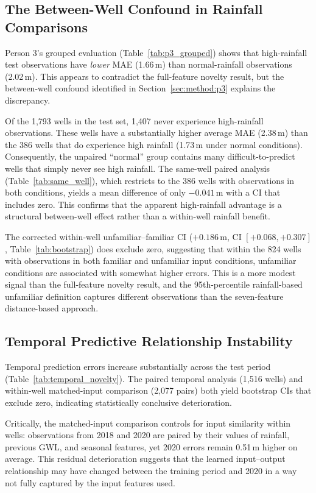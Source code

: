 \documentclass[conference]{IEEEtran}
\begin{document}
\subsection{The Between-Well Confound in Rainfall Comparisons}

Person 3's grouped evaluation (Table~\ref{tab:p3_grouped}) shows that
high-rainfall test observations have \emph{lower} MAE (1.66\,m) than
normal-rainfall observations (2.02\,m).
This appears to contradict the full-feature novelty result, but the
between-well confound identified in Section~\ref{sec:method:p3} explains
the discrepancy.

Of the 1{,}793 wells in the test set, 1{,}407 never experience
high-rainfall observations.
These wells have a substantially higher average MAE (2.38\,m) than the
386 wells that do experience high rainfall (1.73\,m under normal
conditions).
Consequently, the unpaired ``normal'' group contains many
difficult-to-predict wells that simply never see high rainfall.
The same-well paired analysis (Table~\ref{tab:same_well}), which
restricts to the 386 wells with observations in both conditions, yields a
mean difference of only $-0.041$\,m with a CI that includes zero.
This confirms that the apparent high-rainfall advantage is a structural
between-well effect rather than a within-well rainfall benefit.

The corrected within-well unfamiliar--familiar CI
($+0.186$\,m, CI $[+0.068, +0.307]$, Table~\ref{tab:bootstrap}) does
exclude zero, suggesting that within the 824 wells with observations in
both familiar and unfamiliar input conditions, unfamiliar conditions are
associated with somewhat higher errors.
This is a more modest signal than the full-feature novelty result, and
the 95th-percentile rainfall-based unfamiliar definition captures
different observations than the seven-feature distance-based approach.

\subsection{Temporal Predictive Relationship Instability}

Temporal prediction errors increase substantially across the test period
(Table~\ref{tab:temporal_novelty}).
The paired temporal analysis (1{,}516 wells) and within-well matched-input
comparison (2{,}077 pairs) both yield bootstrap CIs that exclude zero,
indicating statistically conclusive deterioration.

Critically, the matched-input comparison controls for input similarity
within wells: observations from 2018 and 2020 are paired by their values
of rainfall, previous GWL, and seasonal features, yet 2020 errors remain
0.51\,m higher on average.
This residual deterioration suggests that the learned input--output
relationship may have changed between the training period and 2020 in a
way not fully captured by the input features used.
\end{document}
